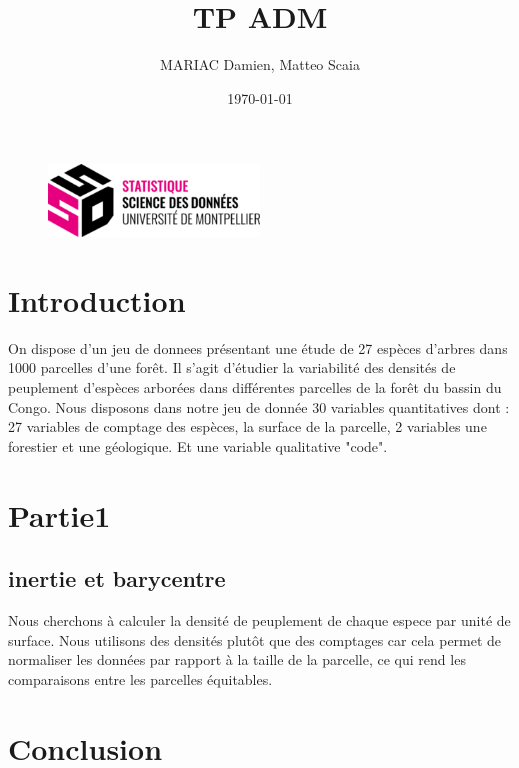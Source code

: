 \documentclass{article}
\title{TP ADM}
\author{MARIAC Damien, Matteo Scaia}
\date{\today}
\begin{document}
\maketitle

\begin{figure}[h] 
    \centering
    \includegraphics[width=0.5\textwidth]{ssd_logo.png} 
\end{figure}

\tableofcontents

\section{Introduction}
On dispose d’un jeu de donnees présentant une étude de 27 espèces d'arbres dans 1000 parcelles d'une forêt.
Il s'agit d'étudier la variabilité des densités de peuplement d'espèces arborées dans différentes parcelles de la forêt du bassin du Congo.
Nous disposons dans notre jeu de donnée 30 variables quantitatives dont : 27 variables de comptage des espèces, la surface de la parcelle, 2 variables une forestier et une géologique.
Et une variable qualitative "code".

\section{Partie1}
\subsection{inertie et barycentre}

Nous cherchons à calculer la densité de peuplement de chaque espece par unité de surface.
Nous utilisons des densités plutôt que des comptages car cela permet de normaliser les données par rapport à la taille de la parcelle,
ce qui rend les comparaisons entre les parcelles équitables.



\section{Conclusion}
\end{document}
